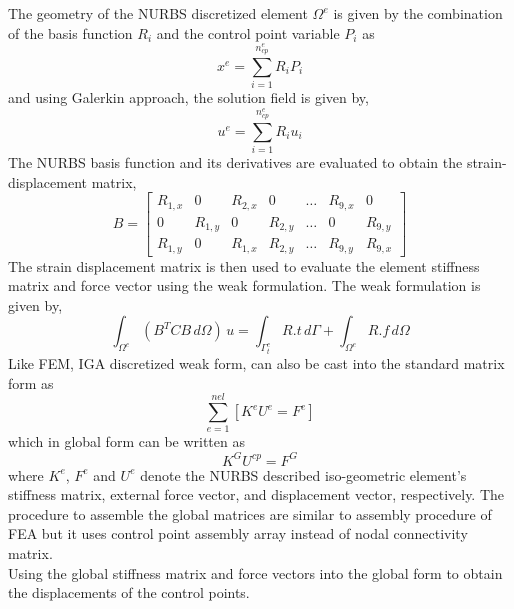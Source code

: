 \documentclass[submit,12pt]{aiaa-pretty} %
\begin{document}
The geometry of the NURBS discretized element $\Omega^e$ is given by the combination of the basis function $R_i$ and the control point variable $P_i$ as
\begin{equation}\nonumber
    x^e = \sum_{i=1}^{n_{cp}^e} R_iP_i
\end{equation}
and using Galerkin approach, the solution field is given by,
\begin{equation}\nonumber
    u^e = \sum_{i=1}^{n_{cp}^e}R_iu_i
\end{equation}
The NURBS basis function and its derivatives are evaluated to obtain the strain-displacement matrix,
    \begin{equation*}
        B=\begin{bmatrix}
        R_{1,x} & 0 & R_{2,x} & 0 & \dots & R_{9,x} & 0\\
        0 & R_{1,y} & 0 &R_{2,y} & \dots & 0 & R_{9,y}\\
        R_{1,y} & 0 &R_{1,x} &  R_{2,y} & \dots &  R_{9,y} &R_{9,x}
        \end{bmatrix}
    \end{equation*}
The strain displacement matrix is then used to evaluate the element stiffness matrix and force vector using the weak formulation. The weak formulation is given by,
\begin{equation*}
        \int_{\Omega^e} (B^TCB  \,d\Omega)\,u = \int_{\Gamma^e_t} R.t \,d\Gamma +\int_{\Omega^e} R.f \,d\Omega
    \end{equation*}
Like FEM, IGA discretized weak form, can also be cast into the standard matrix form as
\begin{equation*}
    \sum_{e=1}^{nel}[K^eU^e=F^e]
\end{equation*}
which in global form can be written as 
\begin{equation}
    K^GU^{cp}=F^G
\end{equation}\label{Global}
where $K^e$, $F^e$ and $U^e$ denote the NURBS described iso-geometric element's stiffness matrix, external force vector, and displacement vector, respectively. The procedure to assemble the global matrices are similar to assembly procedure of FEA but it uses control point assembly array instead of nodal connectivity matrix.\\
Using the global stiffness matrix and force vectors into the global form to obtain the displacements of the control points. 
\end{document}
